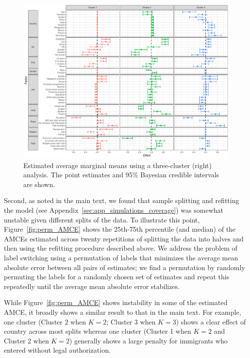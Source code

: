 \begin{figure}[t!]
	\centering {}
	\includegraphics[width=\textwidth]{figures/marginal_means.pdf}
	\caption{Estimated average marginal means using a
		three-cluster (right) analysis. The point
		estimates and 95\% Bayesian credible intervals are shown.} \label{fig:marg_means}
\end{figure}

Second, as noted in the main text, we found that sample splitting and refitting the model (see Appendix~\ref{sec:app_simulations_coverage}) was somewhat unstable given different splits of the data. To illustrate this point, Figure~\ref{fig:perm_AMCE} shows the 25th-75th percentile (and median) of the AMCEs estimated across twenty repetitions of splitting the data into halves and then using the refitting procedure described above. We address the problem of label switching using a permutation of labels that minimizes the average mean absolute error between all pairs of estimates; we find a permutation by randomly permuting the labels for a randomly chosen set of estimates and repeat this repeatedly until the average mean absolute error stabilizes. 

While Figure~\ref{fig:perm_AMCE} shows instability in some of the estimated AMCE, it broadly shows a similar result to that in the main text. For example, one cluster (Cluster 2 when $K=2$; Cluster 3 when $K=3$) shows a clear effect of country across most splits whereas one cluster (Cluster 1 when $K=2$ and Cluster 2 when $K=2$) generally shows a large penalty for immigrants who entered without legal authorization. 

